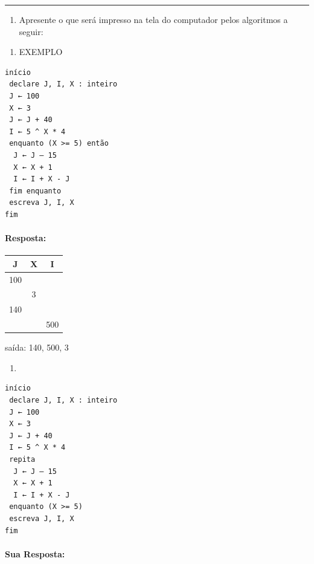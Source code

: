 \documentclass[12pt,a4paper]{article}
\providecommand{\tightlist}{%
      \setlength{\itemsep}{0pt}\setlength{\parskip}{0pt}}
\begin{document}
    \begin{center}\rule{0.5\linewidth}{0.5pt}\end{center}

\begin{enumerate}
\def\labelenumi{\arabic{enumi}.}
\setcounter{enumi}{3}
\tightlist
\item
  Apresente o que será impresso na tela do computador pelos algoritmos a
  seguir:
\end{enumerate}

\begin{enumerate}
\def\labelenumi{\alph{enumi})}
\tightlist
\item
  EXEMPLO
\end{enumerate}

\begin{verbatim}
início
 declare J, I, X : inteiro
 J ← 100
 X ← 3
 J ← J + 40
 I ← 5 ^ X * 4
 enquanto (X >= 5) então
  J ← J – 15
  X ← X + 1
  I ← I + X - J
 fim enquanto
 escreva J, I, X
fim 
\end{verbatim}

    \hypertarget{resposta}{%
\paragraph{Resposta:}\label{resposta}}

\begin{longtable}[]{@{}ccc@{}}
\toprule
J & X & I\tabularnewline
\midrule
\endhead
100 & &\tabularnewline
& 3 &\tabularnewline
140 & &\tabularnewline
& & 500\tabularnewline
\bottomrule
\end{longtable}

saída: 140, 500, 3

    \begin{enumerate}
\def\labelenumi{\alph{enumi})}
\setcounter{enumi}{1}
\tightlist
\item
\end{enumerate}

\begin{verbatim}
início
 declare J, I, X : inteiro
 J ← 100
 X ← 3
 J ← J + 40
 I ← 5 ^ X * 4
 repita
  J ← J – 15
  X ← X + 1
  I ← I + X - J
 enquanto (X >= 5)
 escreva J, I, X
fim
\end{verbatim}

    \hypertarget{sua-resposta}{%
\paragraph{Sua Resposta:}\label{sua-resposta}}
\end{document}
